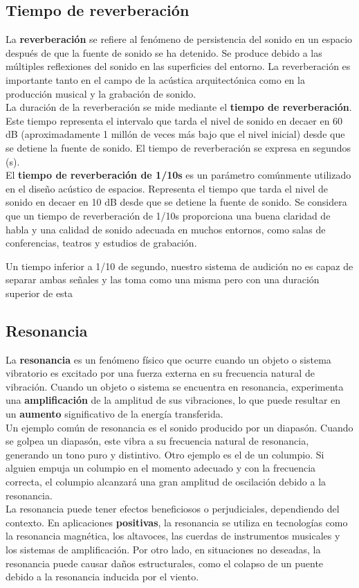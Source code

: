 \documentclass[
	12pt, %
	fleqn, %
	a4paper, %
	oneside, %
]{LegrandOrangeBook}
\begin{document}
\subsection{Tiempo de reverberación}
La \textbf{reverberación} se refiere al fenómeno de persistencia del sonido en un espacio después de que la fuente de sonido se ha detenido. Se produce debido a las múltiples reflexiones del sonido en las superficies del entorno. La reverberación es importante tanto en el campo de la acústica arquitectónica como en la producción musical y la grabación de sonido.\\
La duración de la reverberación se mide mediante el \textbf{tiempo de reverberación}. Este tiempo representa el intervalo que tarda el nivel de sonido en decaer en 60 dB (aproximadamente 1 millón de veces más bajo que el nivel inicial) desde que se detiene la fuente de sonido. El tiempo de reverberación se expresa en segundos (s).\\
El \textbf{tiempo de reverberación de 1/10s} es un parámetro comúnmente utilizado en el diseño acústico de espacios. Representa el tiempo que tarda el nivel de sonido en decaer en 10 dB desde que se detiene la fuente de sonido. Se considera que un tiempo de reverberación de 1/10s proporciona una buena claridad de habla y una calidad de sonido adecuada en muchos entornos, como salas de conferencias, teatros y estudios de grabación.
\begin{remark}
Un tiempo inferior a 1/10 de segundo, nuestro sistema de audición no es capaz de separar ambas señales y las toma como una misma pero con una duración superior de esta
\end{remark}
\subsection{Resonancia}
La \textbf{resonancia} es un fenómeno físico que ocurre cuando un objeto o sistema vibratorio es excitado por una fuerza externa en su frecuencia natural de vibración. Cuando un objeto o sistema se encuentra en resonancia, experimenta una \textbf{amplificación} de la amplitud de sus vibraciones, lo que puede resultar en un \textbf{aumento} significativo de la energía transferida.\\
Un ejemplo común de resonancia es el sonido producido por un diapasón. Cuando se golpea un diapasón, este vibra a su frecuencia natural de resonancia, generando un tono puro y distintivo. Otro ejemplo es el de un columpio. Si alguien empuja un columpio en el momento adecuado y con la frecuencia correcta, el columpio alcanzará una gran amplitud de oscilación debido a la resonancia.\\
La resonancia puede tener efectos beneficiosos o perjudiciales, dependiendo del contexto. En aplicaciones \textbf{positivas}, la resonancia se utiliza en tecnologías como la resonancia magnética, los altavoces, las cuerdas de instrumentos musicales y los sistemas de amplificación. Por otro lado, en situaciones no deseadas, la resonancia puede causar daños estructurales, como el colapso de un puente debido a la resonancia inducida por el viento.
\end{document}
